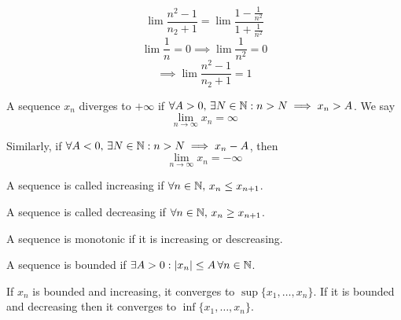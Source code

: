 \documentclass[a4paper,10pt]{article}
\begin{document}
 \begin{ex}
	 \[
		 \lim \frac{n^2 - 1}{n_2 + 1}
		 = \lim \frac{1 - \frac{1}{n^2}}{1 + \frac{1}{n^2}}
	 \]
	 \[ \lim \frac{1}{n} = 0 \implies \lim \frac{1}{n^2} = 0 \]
	 \[ \implies \lim \frac{n^2 - 1}{n_2 + 1} = 1 \]
 \end{ex}

 \begin{defn}[Divergence]
	 A sequence $x_n$ diverges to $+\infty$ if $\forall A > 0, \,
	 \exists N \in \mathbb{N} : n > N \implies x_n > A$. We say
	 \[ \lim_{n \to \infty} x_n = \infty \]

	 Similarly, if $\forall A < 0, \, \exists N \in \mathbb{N} : n > N
	 \implies x_n - A$, then
	 \[ \lim_{n \to \infty} x_n = -\infty \]
 \end{defn}

 \begin{defn}[Increasing]
	 A sequence is called increasing if $\forall n \in \mathbb{N}, \, x_n
	 \leq x_{n+1}$.
 \end{defn}

 \begin{defn}[Decreasing]
	 A sequence is called decreasing if $\forall n \in \mathbb{N}, \, x_n
	 \geq x_{n+1}$.
 \end{defn}

 \begin{defn}[Monotonic]
	 A sequence is monotonic if it is increasing or descreasing.
 \end{defn}

 \begin{defn}[Bounded]
	 A sequence is bounded if $\exists A > 0 : |x_n| \leq A \,
	 \forall n \in \mathbb{N}$.
 \end{defn}

 \begin{thm}
	 If $x_n$ is bounded and increasing, it converges to $\sup\{x_1,
	 \ldots, x_n\}$. If it is bounded and decreasing then it
	 converges to $\inf\{x_1, \ldots, x_n\}$.
 \end{thm}
\end{document}
